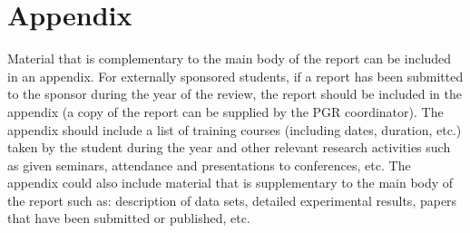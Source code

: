 \section{Appendix}
Material that is complementary to the main body of the report can be included in an appendix. For externally sponsored students, if a report has been submitted to the sponsor during the year of the review, the report should be included in the appendix (a copy of the report can be supplied by the PGR coordinator). The appendix should include a list of training courses (including dates, duration, etc.) taken by the student during the year and other relevant research activities such as given seminars, attendance and presentations to conferences, etc. The appendix could also include material that is supplementary to the main body of the report such as: description of data sets, detailed experimental results, papers that have been submitted or published, etc.